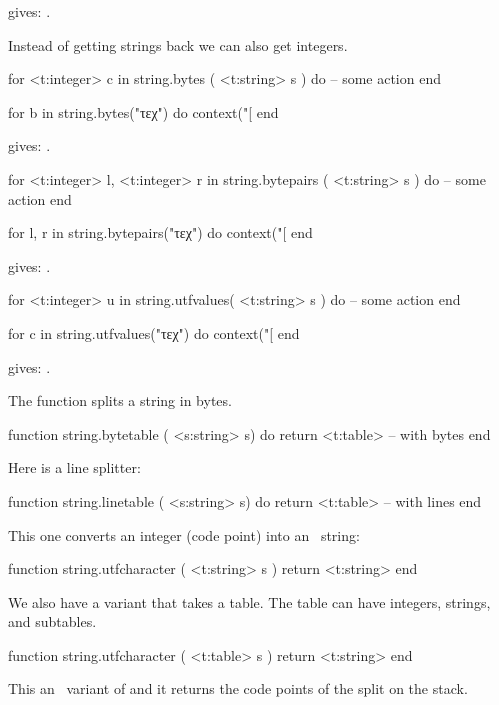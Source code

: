 \typebuffer

gives: \inlinebuffer.

Instead of getting strings back we can also get integers.

\starttyping[option=LUA]
for <t:integer> c in string.bytes ( <t:string> s ) do
    -- some action
end
\stoptyping

\startbuffer
\startluacode
for b in string.bytes("τεχ") do
    context("[%
end
\stopluacode
\stopbuffer

\typebuffer

gives: \inlinebuffer.

\starttyping[option=LUA]
for <t:integer> l, <t:integer> r in string.bytepairs ( <t:string> s ) do
    -- some action
end
\stoptyping

\startbuffer
\startluacode
for l, r in string.bytepairs("τεχ") do
    context("[%
end
\stopluacode
\stopbuffer

\typebuffer

gives: \inlinebuffer.

\starttyping[option=LUA]
for <t:integer> u in string.utfvalues( <t:string> s ) do
    -- some action
end
\stoptyping

\startbuffer
\startluacode
for c in string.utfvalues("τεχ") do
    context("[%
end
\stopluacode
\stopbuffer

\typebuffer

gives: \inlinebuffer.

The  function splits a string in bytes.

\starttyping[option=LUA]
function string.bytetable ( <s:string> s) do
    return <t:table> -- with bytes
end
\stoptyping

Here is a line splitter:

\starttyping[option=LUA]
function string.linetable  ( <s:string> s) do
    return <t:table> -- with lines
end
\stoptyping

This one converts an integer (code point) into an \UTF\ string:

\starttyping[option=LUA]
function string.utfcharacter ( <t:string> s )
    return <t:string>
end
\stoptyping

We also have a variant that takes a table. The table can have integers, strings,
and subtables.

\starttyping[option=LUA]
function string.utfcharacter ( <t:table> s )
    return <t:string>
end
\stoptyping

This an \ variant of  and it returns the code points of
the split on the stack.

